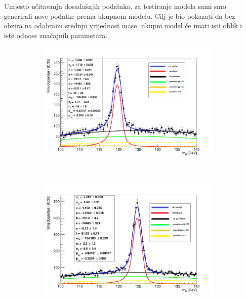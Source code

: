 \documentclass[12pt,a4paper,oneside]{article}
\begin{document}
\begin{linenumbers}
		Umjesto učitavanja dosadašnjih podataka, za testiranje modela sami smo generirali nove podatke prema ukupnom modelu. Cilj je bio pokazati da bez obzira na odabranu srednju vrijednost mase, ukupni model će imati isti oblik i iste odnose značajnih parametara.
						\begin{figure}[H]
			\centering
			\begin{subfigure}[H]{0.7\textwidth}
				\includegraphics[width=\textwidth]{simulation-120.png}
				\caption{}
				\label{fig:model-120}
			\end{subfigure}
			~ %
			\begin{subfigure}[b]{0.7\textwidth}
				\includegraphics[width=\textwidth]{simulation-125.png}
				\caption{}
				\label{fig:model-125}
			\end{subfigure}
			\begin{subfigure}[b]{0.7\textwidth}

\end{subfigure}
\end{figure}
\end{linenumbers}
\end{document}
